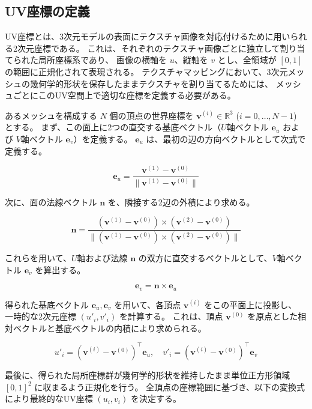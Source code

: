 \subsection{UV座標の定義}\label{UV}

UV座標とは、3次元モデルの表面にテクスチャ画像を対応付けるために用いられる2次元座標である。
これは、それぞれのテクスチャ画像ごとに独立して割り当てられた局所座標系であり、
画像の横軸を $u$、縦軸を $v$ とし、全領域が $[0, 1]$ の範囲に正規化されて表現される。
テクスチャマッピングにおいて、3次元メッシュの幾何学的形状を保存したままテクスチャを割り当てるためには、
メッシュごとにこのUV空間上で適切な座標を定義する必要がある。

あるメッシュを構成する $N$ 個の頂点の世界座標を $\bm{v}^{(i)} \in \mathbb{R}^3$ ($i=0, \dots, N-1$) とする。
まず、この面上に2つの直交する基底ベクトル（$U$軸ベクトル $\bm{e}_u$ および $V$軸ベクトル $\bm{e}_v$）を定義する。
$\bm{e}_u$ は、最初の辺の方向ベクトルとして次式で定義する。

\begin{equation}
  \bm{e}_u = \frac{\bm{v}^{(1)} - \bm{v}^{(0)}}{\|\bm{v}^{(1)} - \bm{v}^{(0)}\|}
\end{equation}

次に、面の法線ベクトル $\bm{n}$ を、隣接する2辺の外積により求める。

\begin{equation}
  \bm{n} = \frac{(\bm{v}^{(1)} - \bm{v}^{(0)}) \times (\bm{v}^{(2)} - \bm{v}^{(0)})}
  {\|(\bm{v}^{(1)} - \bm{v}^{(0)}) \times (\bm{v}^{(2)} - \bm{v}^{(0)})\|}
\end{equation}

これらを用いて、$U$軸および法線 $\bm{n}$ の双方に直交するベクトルとして、$V$軸ベクトル $\bm{e}_v$ を算出する。

\begin{equation}
  \bm{e}_v = \bm{n} \times \bm{e}_u
\end{equation}

得られた基底ベクトル $\bm{e}_u, \bm{e}_v$ を用いて、各頂点 $\bm{v}^{(i)}$ をこの平面上に投影し、
一時的な2次元座標 $(u'_i, v'_i)$ を計算する。
これは、頂点 $\bm{v}^{(0)}$ を原点とした相対ベクトルと基底ベクトルの内積により求められる。

\begin{equation}
  u'_i = (\bm{v}^{(i)} - \bm{v}^{(0)})^\top \bm{e}_u, \quad
  v'_i = (\bm{v}^{(i)} - \bm{v}^{(0)})^\top \bm{e}_v
\end{equation}

最後に、得られた局所座標群が幾何学的形状を維持したまま単位正方形領域 $[0, 1]^2$ に収まるよう正規化を行う。
全頂点の座標範囲に基づき、以下の変換式により最終的なUV座標 $(u_i, v_i)$ を決定する。

